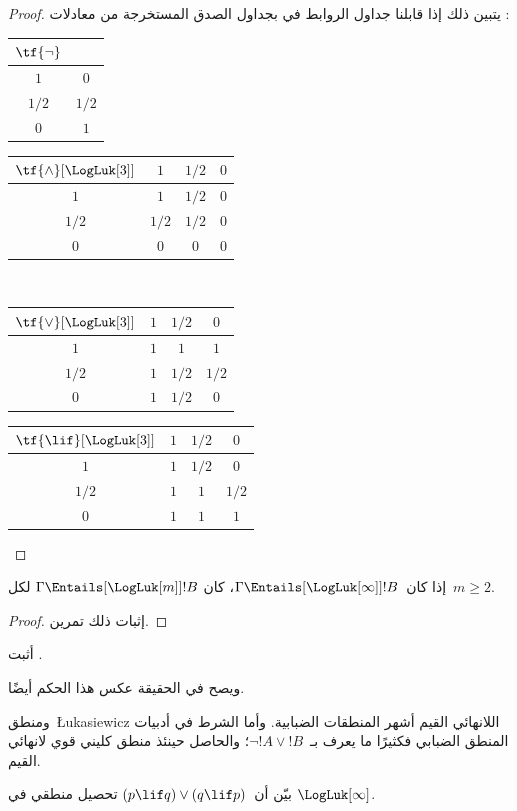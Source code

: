 \documentclass[../../../include/open-logic-section]{subfiles}
\begin{document}
\begin{proof}
  يتبين ذلك إذا قابلنا جداول الروابط في
   بجداول الصدق المستخرجة من
  معادلات :
  \begin{center}
    \begin{tabular}{c|c}
      $\tf{\lnot}$ & \\
      \hline
      $1$ & $0$ \\
      $1/2$ & $1/2$ \\
      $0$ & $1$
    \end{tabular}
    \quad
    \begin{tabular}{c|ccc}
      $\tf{\land}[\LogLuk[3]]$ & $1$ & $1/2$ & $0$ \\
      \hline
      $1$ & $1$ & $1/2$ & $0$ \\
      $1/2$ & $1/2$ & $1/2$ & $0$\\
      $0$ & $0$ & $0$ & $0$
    \end{tabular}
    \\[2ex]
    \begin{tabular}{c|ccc}
      $\tf{\lor}[\LogLuk[3]]$ & $1$ & $1/2$ & $0$ \\
      \hline
      $1$ & $1$ & $1$ & $1$ \\
      $1/2$ & $1$ & $1/2$ & $1/2$ \\
      $0$ & $1$ & $1/2$ & $0$
    \end{tabular}
    \quad
    \begin{tabular}{c|ccc}
      $\tf{\lif}[\LogLuk[3]]$ & $1$ & $1/2$ & $0$ \\
      \hline
      $1$ & $1$ & $1/2$ & $0$ \\
      $1/2$ & $1$ & $1$ & $1/2$  \\
      $0$ & $1$ & $1$ & $1$
    \end{tabular}
  \end{center}
\end{proof}

\begin{prop}
  إذا كان~$\Gamma \Entails[\LogLuk[\infty]] !B$، كان
  $\Gamma \Entails[\LogLuk[m]] !B$ لكل~$m \ge 2$.
\end{prop}

\begin{proof}
  إثبات ذلك تمرين.
\end{proof}

\begin{prob}
  أثبت .
\end{prob}

ويصح في الحقيقة عكس هذا الحكم أيضًا.

ومنطق~\L ukasiewicz اللانهائي القيم أشهر المنطقات الضبابية. وأما
الشرط في أدبيات المنطق الضبابي فكثيرًا ما يعرف بـ~$\lnot !A \lor !B$؛
والحاصل حينئذ منطق كليني قوي لانهائي القيم.

\begin{prob}
  بيّن أن~$(p \lif q) \lor (q \lif p)$ تحصيل منطقي في
  $\LogLuk[\infty]$.
\end{prob}
\end{document}
